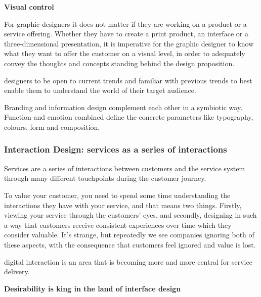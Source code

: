 \textbf{Visual control}

For graphic designers it does not matter if they are working on a product or a service offering. Whether they have to create a print product, an interface or a three-dimensional presentation, it is imperative for the graphic designer to know what they want to offer the customer on a visual level, in order to adequately convey the thoughts and concepts standing behind the design proposition.


designers to be open to current trends and familiar with previous trends to best enable them to understand the world of their target audience.

Branding and information design complement each other in a symbiotic way. Function and emotion combined define the concrete parameters like typography, colours, form and composition.

\subsubsection{Interaction Design: services as a series of interactions}

Services are a series of interactions between customers and the service system through many different touchpoints during the customer journey.

To value your customer, you need to spend some time understanding the interactions they have with your service, and that means two things. Firstly, viewing your service through the customers’ eyes, and secondly, designing in such a way that customers receive consistent experiences over time which they consider valuable. It’s strange, but repeatedly we see companies ignoring both of these aspects, with the consequence that customers feel ignored and value is lost.

digital interaction is an area that is becoming more and more central for service delivery.

\textbf{Desirability is king in the land of interface design}

